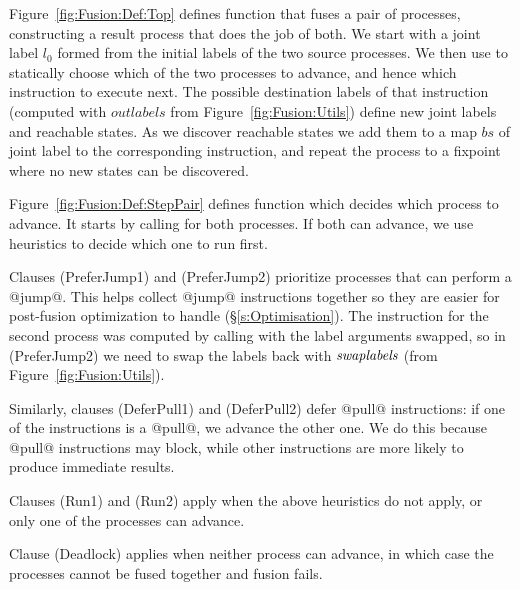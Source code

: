 



\smallskip
Figure~\ref{fig:Fusion:Def:Top} defines function  that fuses a pair of processes, constructing a result process that does the job of both. We start with a joint label $l_0$ formed from the initial labels of the two source processes. We then use  to statically choose which of the two processes to advance, and hence which instruction to execute next. The possible destination labels of that instruction (computed with $outlabels$ from Figure~\ref{fig:Fusion:Utils}) define new joint labels and reachable states. As we discover reachable states we add them to a map $bs$ of joint label to the corresponding instruction, and repeat the process to a fixpoint where no new states can be discovered.




Figure~\ref{fig:Fusion:Def:StepPair} defines function  which decides which process to advance. It starts by calling  for both processes. If both can advance, we use heuristics to decide which one to run first.

Clauses (PreferJump1) and (PreferJump2) prioritize processes that can perform a @jump@. This helps collect @jump@ instructions together so they are easier for post-fusion optimization to handle (\S\ref{s:Optimisation}).
The instruction for the second process was computed by calling  with the label arguments swapped, so in (PreferJump2) we need to swap the labels back with $\textit{swaplabels}$ (from Figure~\ref{fig:Fusion:Utils}).

Similarly, clauses (DeferPull1) and (DeferPull2) defer @pull@ instructions: if one of the instructions is a @pull@, we advance the other one. We do this because @pull@ instructions may block, while other instructions are more likely to produce immediate results.

Clauses (Run1) and (Run2) apply when the above heuristics do not apply, or only one of the processes can advance.

Clause (Deadlock) applies when neither process can advance, in which case the processes cannot be fused together and fusion fails.

